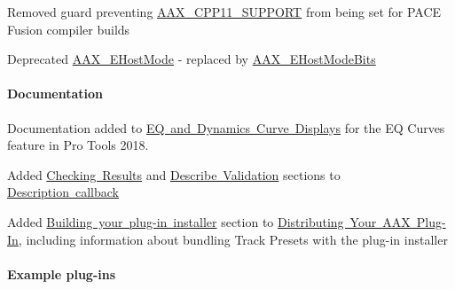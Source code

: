 \begin{DoxyItemize}
\item Removed guard preventing \mbox{\hyperlink{a00392_a2da185ff8aad77278f985a6fe5ee07ba}{A\+A\+X\+\_\+\+C\+P\+P11\+\_\+\+S\+U\+P\+P\+O\+RT}} from being set for P\+A\+CE Fusion compiler builds  
\item Deprecated \mbox{\hyperlink{a00491_af7d77416967955e258539694870f395a}{A\+A\+X\+\_\+\+E\+Host\+Mode}} -\/ replaced by \mbox{\hyperlink{a00491_aa3c8056a6ce601cc3367cb7d4478e9da}{A\+A\+X\+\_\+\+E\+Host\+Mode\+Bits}}  
\end{DoxyItemize}\hypertarget{a00847_aax_sdk_2p3p1_Documentation}{}\paragraph{Documentation}\label{a00847_aax_sdk_2p3p1_Documentation}

\begin{DoxyItemize}
\item Documentation added to \mbox{\hyperlink{a00812}{EQ and Dynamics Curve Displays}} for the EQ Curves feature in Pro Tools 2018.  
\item Added \mbox{\hyperlink{a00796_describe_checking_results}{Checking Results}} and \mbox{\hyperlink{a00796_describe_validation}{Describe Validation}} sections to \mbox{\hyperlink{a00796}{Description callback}}  
\item Added \mbox{\hyperlink{a00843_aax_distributing_installer}{Building your plug-\/in installer}} section to \mbox{\hyperlink{a00843}{Distributing Your A\+AX Plug-\/\+In}}, including information about bundling Track Presets with the plug-\/in installer  
\end{DoxyItemize}\hypertarget{a00847_aax_sdk_2p3p1_ExamplePlugIns}{}\paragraph{Example plug-\/ins}\label{a00847_aax_sdk_2p3p1_ExamplePlugIns}

